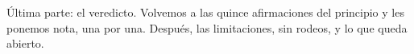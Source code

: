 Última parte: el veredicto. Volvemos a las quince afirmaciones del principio y les ponemos nota, una por una. Después, las limitaciones, sin rodeos, y lo que queda abierto.
